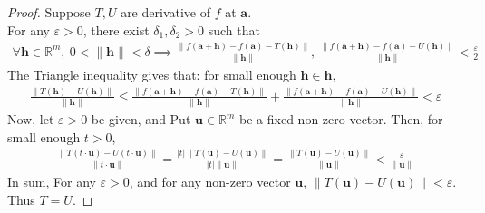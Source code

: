 \documentclass[twoside,openright]{report}
\begin{document}
\begin{proof}
    Suppose $T, U$ are derivative of $f$ at $\mathbf{a}$. \\
    For any $\varepsilon > 0$, there exist $\delta_1, \delta_2 > 0$ such that
    \begin{align*}
        \forall \mathbf{h} \in \mathbb{R}^m,\
        0 < \|\mathbf{h}\| < \delta
        \implies 
        \frac{\|f(\mathbf{a} + \mathbf{h}) - f(\mathbf{a}) - T(\mathbf{h})\|}{\|\mathbf{h}\|},\
        \frac{\|f(\mathbf{a} + \mathbf{h}) - f(\mathbf{a}) - U(\mathbf{h})\|}{\|\mathbf{h}\|} < \frac{\varepsilon}{2}
    \end{align*}
    The Triangle inequality gives that: for small enough $\mathbf{h} \in \mathbf{h}$,
    \begin{align*}
        \frac{\|T(\mathbf{h}) - U(\mathbf{h})\|}{\|\mathbf{h}\|}
        \leq 
        \frac{\|f(\mathbf{a} + \mathbf{h}) - f(\mathbf{a}) - T(\mathbf{h})\|}{\|\mathbf{h}\|} +
        \frac{\|f(\mathbf{a} + \mathbf{h}) - f(\mathbf{a}) - U(\mathbf{h})\|}{\|\mathbf{h}\|}
        < \varepsilon
    \end{align*}
    Now, let $\varepsilon > 0$ be given, and Put $\mathbf{u} \in \mathbb{R}^m$ be a fixed non-zero vector. Then, for small enough $t > 0$,
    \begin{align*}
        \frac{\|T(t \cdot \mathbf{u}) - U(t \cdot \mathbf{u})\|}{\|t \cdot \mathbf{u}\|}
        = \frac{|t| \|T(\mathbf{u}) - U(\mathbf{u})\|}{|t| \|\mathbf{u}\|}
        = \frac{\|T(\mathbf{u}) - U(\mathbf{u})\|}{\|\mathbf{u}\|}
        < \frac{\varepsilon}{\|\mathbf{u}\|}
    \end{align*}
    In sum, For any $\varepsilon > 0$, and for any non-zero vector $\mathbf{u}$, $\|T(\mathbf{u}) - U(\mathbf{u})\| < \varepsilon$.
    Thus $T = U$.
\end{proof}
\end{document}
